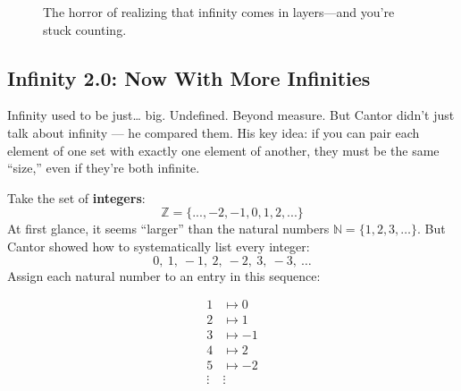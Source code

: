   


\begin{figure}[H]
\centering
{}
\caption{The horror of realizing that infinity comes in layers—and you're stuck counting.}
\end{figure}





\subsection{Infinity 2.0: Now With More Infinities}

Infinity used to be just… big. Undefined. Beyond measure. But Cantor didn’t just talk about infinity — he compared them. His key idea: if you can pair each element of one set with exactly one element of another, they must be the same “size,” even if they're both infinite.

\medskip

Take the set of \textbf{integers}:
\[
\mathbb{Z} = \{ ..., -2, -1, 0, 1, 2, ... \}
\]
At first glance, it seems “larger” than the natural numbers \( \mathbb{N} = \{1, 2, 3, \dots\} \). But Cantor showed how to systematically list every integer:
\[
0,\ 1,\ -1,\ 2,\ -2,\ 3,\ -3,\ \dots
\]
Assign each natural number to an entry in this sequence:

\begin{align*}
  1 &\mapsto 0 \\
  2 &\mapsto 1 \\
  3 &\mapsto -1 \\
  4 &\mapsto 2 \\
  5 &\mapsto -2 \\
  \vdots &\vdots
\end{align*}
  
